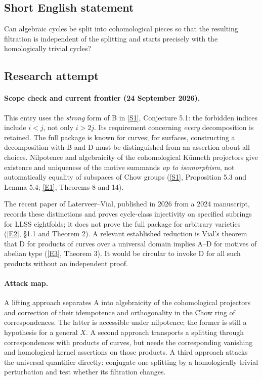 \documentclass[11pt]{article}
\newcommand{\sref}[2]{\hyperlink{source:#1:#2}{[S#2]}}
\newcommand{\eref}[2]{\hyperlink{extra:#1:#2}{[E#2]}}
\begin{document}
\subsection{Short English statement}
Can algebraic cycles be split into cohomological pieces so that the resulting filtration is independent of the splitting and starts precisely with the homologically trivial cycles?
\subsection{Research attempt}

\paragraph{Scope check and current frontier (24 September 2026).}
This entry uses the \emph{strong} form of B in \sref{statement}{1}, Conjecture 5.1:
the forbidden indices include $i<j$, not only $i>2j$.  Its requirement concerning
\emph{every} decomposition is retained.  The full package is known for curves;
for surfaces, constructing a decomposition with B and D must be distinguished
from an assertion about all choices.  Nilpotence and algebraicity of the
cohomological K\"unneth projectors give existence and uniqueness of the motive
summands \emph{up to isomorphism}, not automatically equality of subspaces of
Chow groups (\sref{statement}{1}, Proposition 5.3 and Lemma 5.4;
\eref{statement}{1}, Theorems 8 and 14).

The recent paper of Laterveer--Vial, published in 2026 from a 2024 manuscript,
records these distinctions and proves cycle-class injectivity on specified
subrings for LLSS eightfolds; it does not prove the full package for arbitrary
varieties (\eref{statement}{2}, \S1.1 and Theorem 2).
A relevant established reduction is Vial's theorem that D for products of
curves over a universal domain implies A--D for motives of abelian type
(\eref{statement}{3}, Theorem 3).  It would be circular to invoke D for all such
products without an independent proof.

\paragraph{Attack map.}
A lifting approach separates A into algebraicity of the cohomological
projectors and correction of their idempotence and orthogonality in the Chow
ring of correspondences.  The latter is accessible under nilpotence; the
former is still a hypothesis for a general $X$.  A second approach transports
a splitting through correspondences with products of curves, but needs the
corresponding vanishing and homological-kernel assertions on those products.
A third approach attacks the universal quantifier directly: conjugate one
splitting by a homologically trivial perturbation and test whether its
filtration changes.
\end{document}
